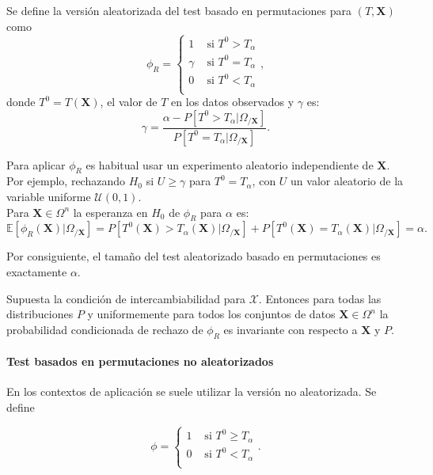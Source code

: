 	Se define la versión aleatorizada del test basado en 
permutaciones para $(T, \mathbf{X})$ como 
	\[ 
		\phi_R = \left\lbrace \begin{array}{cc}
			1 		& \text{ si } T^0 > T_\alpha \\
			\gamma 	& \text{ si } T^0 = T_\alpha \\
			0		& \text{ si } T^0 < T_\alpha \\
		\end{array} \right. ,
	\]
	donde $T^0 = T(\mathbf{X})$, el valor de $T$ en los datos 
observados y $\gamma$ es:
	\[
		\gamma = \frac{\alpha - P[T^0 > T_\alpha | 
								\Omega_{/\mathbf{X}}]}
					  {P[T^0 = T_\alpha | 
								\Omega_{/\mathbf{X}}]} .
	\]
	
	Para aplicar $\phi_R$ es habitual usar un experimento 
aleatorio independiente de $\mathbf{X}$. Por ejemplo, 
rechazando $H_0$ si $U \geq \gamma$ para $T^0 = T_\alpha$, 
con $U$ un valor aleatorio de la variable uniforme 
$\mathcal{U}(0,1)$.\\
	Para $\mathbf{X} \in \Omega^n$ la esperanza en $H_0$ de 
$\phi_R$ para $\alpha$ es:
	\[ 
		\mathbb{E}[ \phi_R(\mathbf{X}) | \Omega_{/\mathbf{X}}] =
			P[ T^0(\mathbf{X}) > T_\alpha(\mathbf{X}) | 
								\Omega_{/\mathbf{X}}] + 
			P[ T^0(\mathbf{X}) = T_\alpha(\mathbf{X}) | 
								\Omega_{/\mathbf{X}}] =
			\alpha .
	\]
	
	Por consiguiente, el tamaño del test aleatorizado basado en 
permutaciones es exactamente $\alpha$.
	
\begin{proposicion}
	Supuesta la condición de intercambiabilidad para 
$\mathcal{X}$. Entonces para todas las distribuciones $P$ y 
uniformemente para todos los conjuntos de datos $\mathbf{X} 
\in \Omega^n$ la probabilidad condicionada de rechazo de 
$\phi_R$ es invariante con respecto a $\mathbf{X}$ y $P$.
\end{proposicion}

\paragraph{Test basados en permutaciones no aleatorizados}

	En los contextos de aplicación se suele utilizar la 
versión no aleatorizada. Se define
	
	\[ 
		\phi = \left\lbrace \begin{array}{cc}
			1 		& \text{ si } T^0 \geq T_\alpha \\
			0		& \text{ si } T^0 < T_\alpha \\
		\end{array} \right. .
	\]
	
